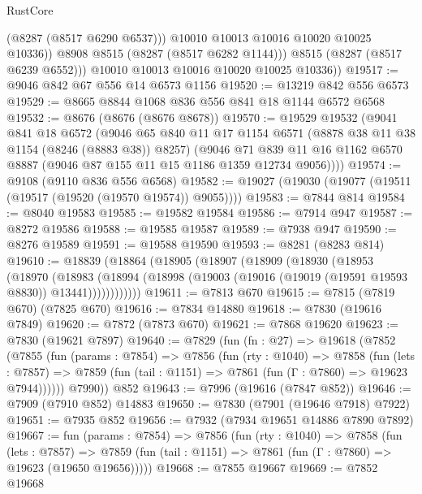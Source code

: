 \begin{lexlean}{RustCore}
\begin{coremodule}
                  (@8287 (@8517 @6290 @6537)))
                @10010
                @10013
                @10016
                @10020
                @10025
                @10336))
            @8908
            @8515
            (@8287 (@8517 @6282 @1144)))
          @8515
          (@8287 (@8517 @6239 @6552)))
        @10010
        @10013
        @10016
        @10020
        @10025
        @10336))
@19517 := @9046 @842 @67 @556 @14 @6573 @1156
@19520 := @13219 @842 @556 @6573
@19529 := @8665 @8844 @1068 @836 @556 @841 @18 @1144 @6572 @6568
@19532 := @8676 (@8676 (@8676 @8678))
@19570 := @19529
    @19532
    (@9041
      @841
      @18
      @6572
      (@9046
        @65
        @840
        @11
        @17
        @1154
        @6571
        (@8878 @38 @11 @38 @1154 (@8246 (@8883 @38)) @8257)
        (@9046
          @71
          @839
          @11
          @16
          @1162
          @6570
          @8887
          (@9046 @87 @155 @11 @15 @1186 @1359 @12734 @9056))))
@19574 := @9108 (@9110 @836 @556 @6568)
@19582 := @19027 (@19030 (@19077 (@19511 (@19517 (@19520 (@19570 @19574)) @9055))))
@19583 := @7844 @814
@19584 := @8040 @19583
@19585 := @19582 @19584
@19586 := @7914 @947
@19587 := @8272 @19586
@19588 := @19585 @19587
@19589 := @7938 @947
@19590 := @8276 @19589
@19591 := @19588 @19590
@19593 := @8281 (@8283 @814)
@19610 := @18839
    (@18864
      (@18905
        (@18907
          (@18909
            (@18930
              (@18953
                (@18970
                  (@18983
                    (@18994
                      (@18998 (@19003 (@19016 (@19019 (@19591 @19593 @8830)) @13441))))))))))))
@19611 := @7813 @670
@19615 := @7815 (@7819 @670) (@7825 @670)
@19616 := @7834 @14880
@19618 := @7830 (@19616 @7849)
@19620 := @7872 (@7873 @670)
@19621 := @7868 @19620
@19623 := @7830 (@19621 @7897)
@19640 := @7829
    (fun (fn : @27) =>
    @19618
      (@7852
        (@7855
          (fun (params : @7854) =>
          @7856
            (fun (rty : @1040) =>
            @7858
              (fun (lets : @7857) =>
              @7859 (fun (tail : @1151) => @7861 (fun (Γ : @7860) => @19623 @7944))))))
        @7990))
    @852
@19643 := @7996 (@19616 (@7847 @852))
@19646 := @7909 (@7910 @852) @14883
@19650 := @7830 (@7901 (@19646 @7918) @7922)
@19651 := @7935 @852
@19656 := @7932 (@7934 @19651 @14886 @7890 @7892)
@19667 := fun (params : @7854) =>
  @7856
    (fun (rty : @1040) =>
    @7858
      (fun (lets : @7857) =>
      @7859 (fun (tail : @1151) => @7861 (fun (Γ : @7860) => @19623 (@19650 @19656)))))
@19668 := @7855 @19667
@19669 := @7852 @19668

\end{coremodule}
\end{lexlean}
